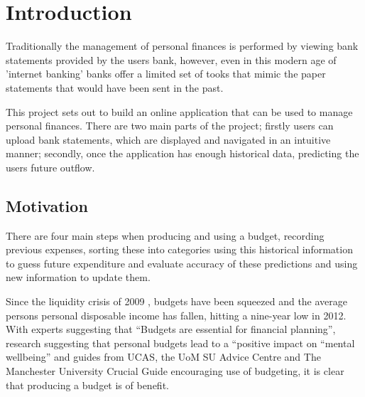 \chapter{Introduction}

\begin{comment}
This chapter puts the work into context. Having read it, the reader should be left in no doubt as to:

- the topic area to which the work applies
- why the work is being done
- what else has been done in the area and by whom
 - how the author proposes to tackle the problem: The project proposal is often expressed in terms of a main objective and possibly one or more additional objectives. It is useful to define "milestones" or "sub-goals" that mark the progress towards the objectives. 
 - It is common to end this chapter with a brief overview of each of the subsequent chapters of the report.
\end{comment}

Traditionally the management of personal finances is performed by viewing bank statements provided by the users bank, however, even in this modern age of 'internet banking' banks offer a limited set of tooks that mimic the paper statements that would have been sent in the past.

This project sets out to build an online application that can be used to manage personal finances. There are two main parts of the project; firstly users can upload bank statements, which are displayed and navigated in an intuitive manner; secondly, once the application has enough historical data, predicting the users future outflow.

\section{Motivation}
There are four main steps when producing and using a budget, recording previous expenses, sorting these into categories
using this historical information to guess future expenditure and evaluate accuracy of these predictions and using new information to update them.

Since the liquidity crisis of 2009 \cite{gore2010}, budgets have been squeezed and the average persons personal disposable income has fallen, hitting a nine-year low in 2012\cite{barnard2012households}. With experts suggesting that ``Budgets are essential for financial planning''\cite{wsj2013budget}, research suggesting that personal budgets lead to a ``positive impact on ``mental wellbeing''\cite{tlap2013budget} and guides from UCAS, the UoM SU Advice Centre and The Manchester University Crucial Guide encouraging use of budgeting, it is clear that producing a budget is of benefit.

